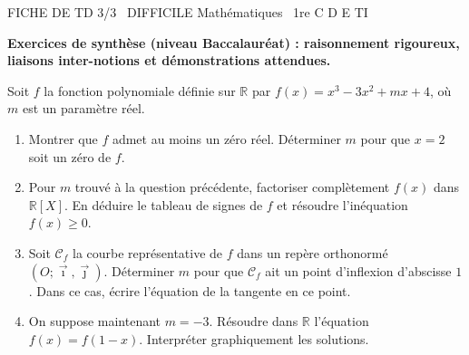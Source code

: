 \documentclass[11pt]{article}
\begin{document}
\begin{tcolorbox}[enhanced,colback=popink,colframe=popink,arc=10pt,boxrule=0pt,left=12pt,right=12pt,top=9pt,bottom=9pt]
{\color{white}\popxbold\small FICHE DE TD 3/3 \textbullet\ DIFFICILE \hfill Mathématiques \textbullet\ 1re C D E TI\par}
\end{tcolorbox}
\vspace{4pt}
\textbf{Exercices de synthèse (niveau Baccalauréat) : raisonnement rigoureux, liaisons inter-notions et démonstrations attendues.}

\begin{exercice}
Soit $f$ la fonction polynomiale définie sur $\mathbb{R}$ par $f(x)=x^3-3x^2+mx+4$, où $m$ est un paramètre réel.
\begin{enumerate}
    \item Montrer que $f$ admet au moins un zéro réel. Déterminer $m$ pour que $x=2$ soit un zéro de $f$.
    \item Pour $m$ trouvé à la question précédente, factoriser complètement $f(x)$ dans $\mathbb{R}[X]$. En déduire le tableau de signes de $f$ et résoudre l'inéquation $f(x) \geqslant 0$.
    \item Soit $\mathcal{C}_f$ la courbe représentative de $f$ dans un repère orthonormé $(O;\vec{\imath},\vec{\jmath})$. Déterminer $m$ pour que $\mathcal{C}_f$ ait un point d'inflexion d'abscisse $1$. Dans ce cas, écrire l'équation de la tangente en ce point.
    \item On suppose maintenant $m=-3$. Résoudre dans $\mathbb{R}$ l'équation $f(x)=f(1-x)$. Interpréter graphiquement les solutions.
\end{enumerate}
\end{exercice}
\end{document}
